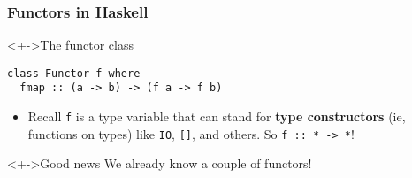 \documentclass{beamer}
\begin{document}
\begin{frame}[fragile]
  \frametitle{Functors in Haskell}
\begin{alertblock}<+->{The functor class}
\begin{lstlisting}
class Functor f where
  fmap :: (a -> b) -> (f a -> f b)
\end{lstlisting}
    \begin{itemize}
  \item Recall \texttt{f} is a type variable that can
    stand for \textbf{type
      constructors} (ie, functions on types) like  \texttt{IO},
    \texttt{[]}, and others.  So \lstinline|f :: * -> *|!
  \end{itemize}
\end{alertblock}
\begin{exampleblock}<+->{Good news}
  We already know a couple of functors!
\end{exampleblock}
\end{frame}
\end{document}
